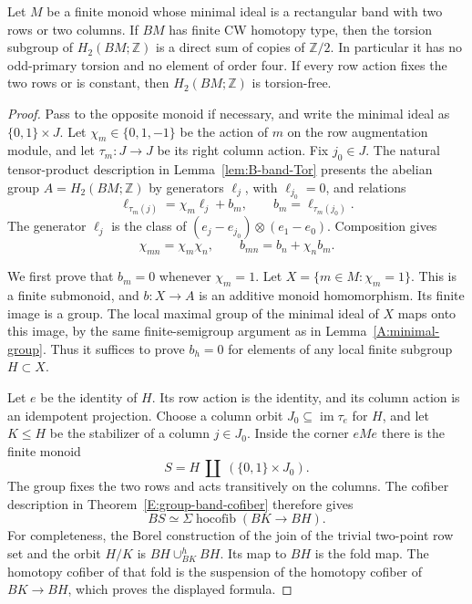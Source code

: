 \begin{proposition}
\label{B:two-row-torsion}
Let $M$ be a finite monoid whose minimal ideal is a rectangular band
with two rows or two columns. If $BM$ has finite CW homotopy type, then
the torsion subgroup of $H_2(BM;\mathbb Z)$ is a direct sum of copies
of $\mathbb Z/2$. In particular it has no odd-primary torsion and no
element of order four. If every row action fixes the two rows or is
constant, then $H_2(BM;\mathbb Z)$ is torsion-free.
\end{proposition}
\begin{proof}
Pass to the opposite monoid if necessary, and write the minimal ideal
as $\{0,1\}\times J$. Let $\chi_m\in\{0,1,-1\}$ be the action of $m$
on the row augmentation module, and let $\tau_m:J\to J$ be its right
column action. Fix $j_0\in J$. The natural tensor-product description
in Lemma~\ref{lem:B-band-Tor} presents the abelian group
$A=H_2(BM;\mathbb Z)$ by generators $\ell_j$, with $\ell_{j_0}=0$,
and relations
\begin{equation}\label{B:torsion-affine}
 \ell_{\tau_m(j)}=\chi_m\ell_j+b_m,
 \qquad b_m=\ell_{\tau_m(j_0)}.
\end{equation}
The generator $\ell_j$ is the class of
$(e_j-e_{j_0})\otimes(e_1-e_0)$. Composition gives
\[
 \chi_{mn}=\chi_m\chi_n,\qquad
 b_{mn}=b_n+\chi_n b_m.
\]

We first prove that $b_m=0$ whenever $\chi_m=1$. Let
$X=\{m\in M:\chi_m=1\}$. This is a finite submonoid, and
$b:X\to A$ is an additive monoid homomorphism. Its finite image is a
group. The local maximal group of the minimal ideal of $X$ maps onto
this image, by the same finite-semigroup argument as in
Lemma~\ref{A:minimal-group}. Thus it suffices to prove $b_h=0$ for elements
of any local finite subgroup $H\subset X$.

Let $e$ be the identity of $H$. Its row action is the identity, and its
column action is an idempotent projection. Choose a column orbit
$J_0\subseteq\operatorname{im}\tau_e$ for $H$, and let $K\leq H$ be
the stabilizer of a column $j\in J_0$. Inside the corner $eMe$ there is
the finite monoid
\[
 S=H\ \amalg\ (\{0,1\}\times J_0).
\]
The group fixes the two rows and acts transitively on the columns.
The cofiber description in Theorem~\ref{E:group-band-cofiber}
therefore gives
\begin{equation}\label{B:torsion-group-orbit}
 BS\simeq\Sigma\operatorname{hocofib}(BK\longrightarrow BH).
\end{equation}
For completeness, the Borel construction of the join of the trivial
two-point row set and the orbit $H/K$ is
$BH\cup^h_{BK}BH$. Its map to $BH$ is the fold map. The homotopy
cofiber of that fold is the suspension of the homotopy cofiber of
$BK\to BH$, which proves the displayed formula.


\end{proof}
